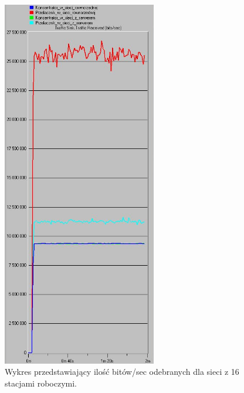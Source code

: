\documentclass{article}
\begin{document}
\begin{figure}[H]
  \centering
  \includegraphics[width=0.60\textwidth]{screens/16_recv.png}
 \caption{Wykres przedstawiający ilość bitów/sec odebranych dla sieci z 16 stacjami roboczymi.}
 \label{fig:16stacjer}
\end{figure}
\end{document}
